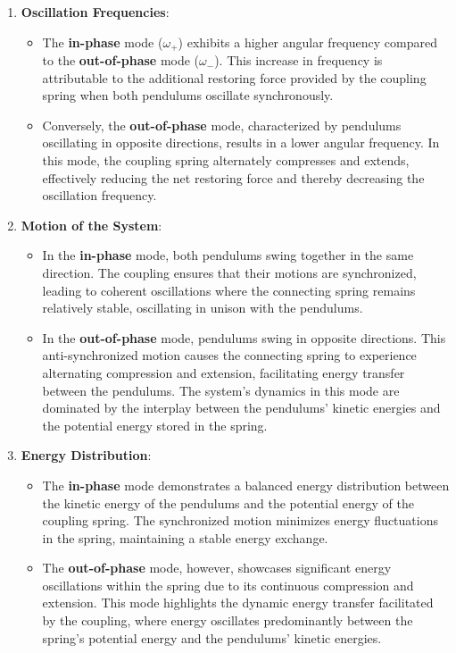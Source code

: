 \documentclass[12pt]{report} %
\begin{document}
\begin{enumerate}
    \item \textbf{Oscillation Frequencies}:
    \begin{itemize}
        \item The \textbf{in-phase} mode (\( \omega_+ \)) exhibits a higher angular frequency compared to the \textbf{out-of-phase} mode (\( \omega_- \)). This increase in frequency is attributable to the additional restoring force provided by the coupling spring when both pendulums oscillate synchronously.
        \item Conversely, the \textbf{out-of-phase} mode, characterized by pendulums oscillating in opposite directions, results in a lower angular frequency. In this mode, the coupling spring alternately compresses and extends, effectively reducing the net restoring force and thereby decreasing the oscillation frequency.
    \end{itemize}
    
    \item \textbf{Motion of the System}:
    \begin{itemize}
        \item In the \textbf{in-phase} mode, both pendulums swing together in the same direction. The coupling ensures that their motions are synchronized, leading to coherent oscillations where the connecting spring remains relatively stable, oscillating in unison with the pendulums.
        \item In the \textbf{out-of-phase} mode, pendulums swing in opposite directions. This anti-synchronized motion causes the connecting spring to experience alternating compression and extension, facilitating energy transfer between the pendulums. The system's dynamics in this mode are dominated by the interplay between the pendulums' kinetic energies and the potential energy stored in the spring.
    \end{itemize}
    
    \item \textbf{Energy Distribution}:
    \begin{itemize}
        \item The \textbf{in-phase} mode demonstrates a balanced energy distribution between the kinetic energy of the pendulums and the potential energy of the coupling spring. The synchronized motion minimizes energy fluctuations in the spring, maintaining a stable energy exchange.
        \item The \textbf{out-of-phase} mode, however, showcases significant energy oscillations within the spring due to its continuous compression and extension. This mode highlights the dynamic energy transfer facilitated by the coupling, where energy oscillates predominantly between the spring's potential energy and the pendulums' kinetic energies.
    \end{itemize}
\end{enumerate}
\end{document}
